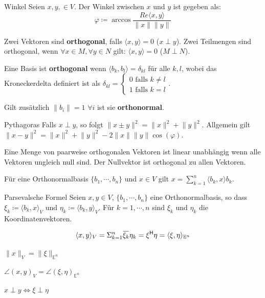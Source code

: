 \documentclass[a4paper,10pt]{article}
\newcommand*{\hermconj}{\mathsf{H}}
\def\E{\mathbb{E}}
\newcommand{\overbar}[1]{\mkern 1.5mu\overline{\mkern-1.5mu#1\mkern-1.5mu}\mkern 1.5mu}
\begin{document}
\begin{subbox}{Winkel}
  Seien $x, y, \in V$. Der Winkel zwischen $x$ und $y$ ist gegeben als:
  $$\varphi \coloneqq \arccos \frac{Re \langle x, y \rangle}{\lVert x \rVert \lVert y \rVert}$$
\end{subbox}

Zwei Vektoren sind \textbf{orthogonal}, falls $\langle x, y \rangle = 0$ ($x \perp y$). Zwei Teilmengen sind orthogonal, wenn $\forall x \in M, \forall y \in N$ gilt: $\langle x, y \rangle = 0$ ($M \perp N$).

Eine Basis ist \textbf{orthogonal} wenn $\langle b_k, b_l \rangle = \delta_{kl}$ für alle $k, l$, wobei das Kroneckerdelta definiert ist als
$\delta_{kl} = \begin{cases}
  0\text{ falls }k \neq l \\
  1\text{ falls }k = l
\end{cases}$.

Gilt zusätzlich $\lVert b_i \rVert = 1$ $\forall i$ ist sie \textbf{orthonormal}.

\begin{subbox}{Pythagoras}
  Falls $x \perp y$, so folgt $\lVert x \pm y \rVert^2 = \lVert x \rVert^2 + \lVert y \rVert^2$. Allgemein gilt $\lVert x - y \rVert^2 = \lVert x \rVert^2 + \lVert y \rVert^2 - 2 \lVert x \rVert \lVert y \rVert \cos (\varphi)$.
\end{subbox}

Eine Menge von paarweise orthogonalen Vektoren ist linear unabhängig wenn alle Vektoren ungleich null sind. Der Nullvektor ist orthogonal zu allen Vektoren.

Für eine Orthonormalbasis $\{b_1, \cdots, b_n\}$ und $x \in V$ gilt $x = \sum_{k=1}^n \langle b_k, x \rangle b_k$.

\begin{mainbox}{Parsevalsche Formel}
  Seien $x, y \in V$, $\{ b_1, \cdots, b_n \}$ eine Orthonormalbasis, so dass $\xi_k \coloneqq \langle b_k, x \rangle_V$ und $\eta_k \coloneqq \langle b_k, y \rangle_V$. Für $k = 1, \cdots, n$ sind $\xi_k$ und $\eta_k$ die Koordinatenvektoren. 

  $$\langle x, y \rangle_V = \Sigma_{k=1}^n \overbar{\xi_k} \eta_k = \xi^\hermconj \eta = \langle \xi, \eta \rangle_{\E^n}$$

  \begin{rowlist}
    \item $\lVert x \rVert_V = \lVert \xi \rVert_{\E^n}$
    \item $\angle (x,y)_V = \angle (\xi, \eta)_{\E^n}$
    \item $x \perp y \iff \xi \perp \eta$
  \end{rowlist}
\end{mainbox}
\end{document}
